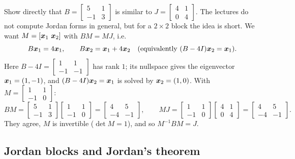 \begin{example}\label{ex:u32-chain}
Show directly that $B=\begin{bmatrix}5&1\\-1&3\end{bmatrix}$ is similar to $J=\begin{bmatrix}4&1\\0&4\end{bmatrix}$.
The lectures do not compute Jordan forms in general, but for a $2\times2$ block the idea is short.
We want $M=[\vb{x}_1\ \vb{x}_2]$ with $BM=MJ$, i.e.
\[
  B\boldsymbol{x}_1=4\boldsymbol{x}_1,\qquad B\boldsymbol{x}_2=\boldsymbol{x}_1+4\boldsymbol{x}_2\quad\text{(equivalently } (B-4I)\boldsymbol{x}_2=\boldsymbol{x}_1\text{)}.
\]
Here $B-4I=\left[\begin{smallmatrix}1&1\\-1&-1\end{smallmatrix}\right]$ has rank $1$; its nullspace gives
the eigenvector $\boldsymbol{x}_1=(1,-1)$, and $(B-4I)\boldsymbol{x}_2=\boldsymbol{x}_1$ is solved by $\boldsymbol{x}_2=(1,0)$. With
$M=\left[\begin{smallmatrix}1&1\\-1&0\end{smallmatrix}\right]$:
\[
  BM=\begin{bmatrix}5&1\\-1&3\end{bmatrix}\begin{bmatrix}1&1\\-1&0\end{bmatrix}=\begin{bmatrix}4&5\\-4&-1\end{bmatrix},
  \qquad
  MJ=\begin{bmatrix}1&1\\-1&0\end{bmatrix}\begin{bmatrix}4&1\\0&4\end{bmatrix}=\begin{bmatrix}4&5\\-4&-1\end{bmatrix}.
\]
They agree, $M$ is invertible ($\det M=1$), and so $M^{-1}BM=J$.
\end{example}

\subsection{Jordan blocks and Jordan's theorem}

